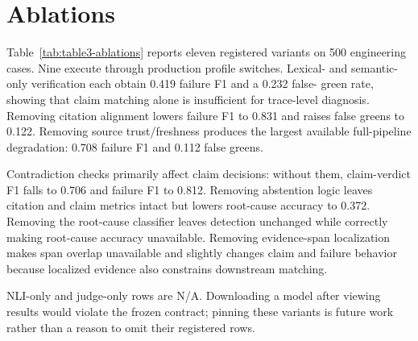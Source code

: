 \section{Ablations}
Table~\ref{tab:table3-ablations} reports eleven registered variants on 500
engineering cases. Nine execute through production profile switches. Lexical-
and semantic-only verification each obtain 0.419 failure F1 and a 0.232 false-
green rate, showing that claim matching alone is insufficient for trace-level
diagnosis. Removing citation alignment lowers failure F1 to 0.831 and raises
false greens to 0.122. Removing source trust/freshness produces the largest
available full-pipeline degradation: 0.708 failure F1 and 0.112 false greens.

Contradiction checks primarily affect claim decisions: without them,
claim-verdict F1 falls to 0.706 and failure F1 to 0.812. Removing abstention
logic leaves citation and claim metrics intact but lowers root-cause accuracy to
0.372. Removing the root-cause classifier leaves detection unchanged while
correctly making root-cause accuracy unavailable. Removing evidence-span
localization makes span overlap unavailable and slightly changes claim and
failure behavior because localized evidence also constrains downstream matching.

NLI-only and judge-only rows are N/A. Downloading a model after viewing results
would violate the frozen contract; pinning these variants is future work rather
than a reason to omit their registered rows.


